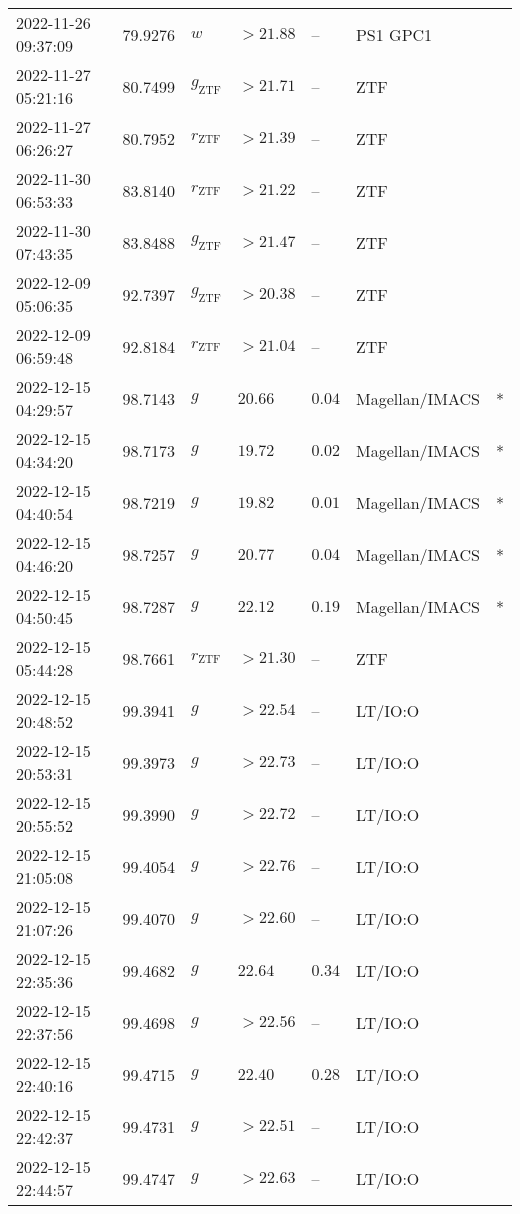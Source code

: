 \documentclass{nature_plusfigure}
\begin{document}
\begin{supplement}
\begin{center}
\begin{longtable}{lllllll}
2022-11-26 09:37:09 & 79.9276 & $w$ & $>21.88$ & -- & PS1 GPC1 &  \\ 
2022-11-27 05:21:16 & 80.7499 & ${g}_\mathrm{ZTF}$ & $>21.71$ & -- & ZTF &  \\ 
2022-11-27 06:26:27 & 80.7952 & ${r}_\mathrm{ZTF}$ & $>21.39$ & -- & ZTF &  \\ 
2022-11-30 06:53:33 & 83.8140 & ${r}_\mathrm{ZTF}$ & $>21.22$ & -- & ZTF &  \\ 
2022-11-30 07:43:35 & 83.8488 & ${g}_\mathrm{ZTF}$ & $>21.47$ & -- & ZTF &  \\ 
2022-12-09 05:06:35 & 92.7397 & ${g}_\mathrm{ZTF}$ & $>20.38$ & -- & ZTF &  \\ 
2022-12-09 06:59:48 & 92.8184 & ${r}_\mathrm{ZTF}$ & $>21.04$ & -- & ZTF &  \\ 
2022-12-15 04:29:57 & 98.7143 & $g$ & $20.66$ & $0.04$ & Magellan/IMACS & * \\ 
2022-12-15 04:34:20 & 98.7173 & $g$ & $19.72$ & $0.02$ & Magellan/IMACS & * \\ 
2022-12-15 04:40:54 & 98.7219 & $g$ & $19.82$ & $0.01$ & Magellan/IMACS & * \\ 
2022-12-15 04:46:20 & 98.7257 & $g$ & $20.77$ & $0.04$ & Magellan/IMACS & * \\ 
2022-12-15 04:50:45 & 98.7287 & $g$ & $22.12$ & $0.19$ & Magellan/IMACS & * \\ 
2022-12-15 05:44:28 & 98.7661 & ${r}_\mathrm{ZTF}$ & $>21.30$ & -- & ZTF &  \\ 
2022-12-15 20:48:52 & 99.3941 & $g$ & $>22.54$ & -- & LT/IO:O &  \\ 
2022-12-15 20:53:31 & 99.3973 & $g$ & $>22.73$ & -- & LT/IO:O &  \\ 
2022-12-15 20:55:52 & 99.3990 & $g$ & $>22.72$ & -- & LT/IO:O &  \\ 
2022-12-15 21:05:08 & 99.4054 & $g$ & $>22.76$ & -- & LT/IO:O &  \\ 
2022-12-15 21:07:26 & 99.4070 & $g$ & $>22.60$ & -- & LT/IO:O &  \\ 
2022-12-15 22:35:36 & 99.4682 & $g$ & $22.64$ & $0.34$ & LT/IO:O &  \\ 
2022-12-15 22:37:56 & 99.4698 & $g$ & $>22.56$ & -- & LT/IO:O &  \\ 
2022-12-15 22:40:16 & 99.4715 & $g$ & $22.40$ & $0.28$ & LT/IO:O &  \\ 
2022-12-15 22:42:37 & 99.4731 & $g$ & $>22.51$ & -- & LT/IO:O &  \\ 
2022-12-15 22:44:57 & 99.4747 & $g$ & $>22.63$ & -- & LT/IO:O &  \\ 

\end{longtable}
\end{center}
\end{supplement}
\end{document}
